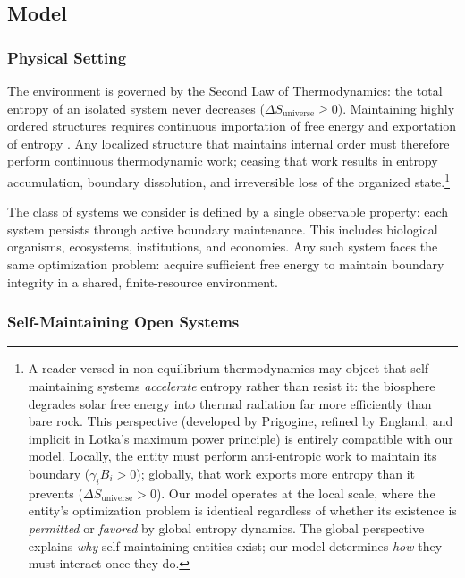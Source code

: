 \documentclass[11pt]{article}
\theoremstyle{plain}
\theoremstyle{definition}
\theoremstyle{remark}
\let\origsubsection\subsection
\renewcommand{\subsection}{\needspace{7\baselineskip}\origsubsection}
\let\origsubsubsection\subsubsection
\renewcommand{\subsubsection}{\needspace{4\baselineskip}\origsubsubsection}
\begin{document}
\subsection{Model}\label{model}

\subsubsection{Physical Setting}\label{physical-setting}

The environment is governed by the Second Law of Thermodynamics: the
total entropy of an isolated system never decreases
(\(\Delta S_{\text{universe}} \geq 0\)). Maintaining highly ordered
structures requires continuous importation of free energy and
exportation of entropy \citep{Clausius1865, Boltzmann1877, Planck1897}.
Any localized structure that maintains internal order must therefore
perform continuous thermodynamic work; ceasing that work results in
entropy accumulation, boundary dissolution, and irreversible loss of the
organized state.\footnote{A reader versed in non-equilibrium
  thermodynamics may object that self-maintaining systems
  \emph{accelerate} entropy rather than resist it: the biosphere
  degrades solar free energy into thermal radiation far more efficiently
  than bare rock. This perspective (developed by Prigogine, refined by
  England, and implicit in Lotka's maximum power principle) is entirely
  compatible with our model. Locally, the entity must perform
  anti-entropic work to maintain its boundary (\(\gamma_i B_i > 0\));
  globally, that work exports more entropy than it prevents
  (\(\Delta S_{\text{universe}} > 0\)). Our model operates at the local
  scale, where the entity's optimization problem is identical regardless
  of whether its existence is \emph{permitted} or \emph{favored} by
  global entropy dynamics. The global perspective explains \emph{why}
  self-maintaining entities exist; our model determines \emph{how} they
  must interact once they do.}

The class of systems we consider is defined by a single observable
property: each system persists through active boundary maintenance. This
includes biological organisms, ecosystems, institutions, and economies.
Any such system faces the same optimization problem: acquire sufficient
free energy to maintain boundary integrity in a shared, finite-resource
environment.

\subsubsection{Self-Maintaining Open
Systems}\label{self-maintaining-open-systems}
\end{document}
